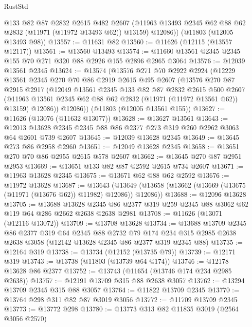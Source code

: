 \begin{lexlean}{RustStd}
\begin{coremodule}
        @133
        @82
        @87
        @2832
        @2615
        @482
        @2607
        (@11963 @13493 @2345 @62 @88 @62 @2832 (@11971 (@11972 @13493 @62)) @13159)
        @12086))
    (@11803 (@12005 @13493 @98))
@13557 := @11631 @82
@13560 := @11626 (@12115 (@13557 @12117))
@13561 := @13560 @13493
@13574 := @11660 @13561 @2345 @2345 @155 @70 @271 @320 @88 @2926 @155 @2896 @2965 @3064
@13576 := @12039 @13561 @2345
@13624 := @13574
    (@13576
      @271
      @70
      @2922
      @2924
      (@12229
        @13561
        @2345
        @270
        @70
        @86
        @2919
        @2615
        @495
        @2607
        (@13576
          @270
          @87
          @2915
          @2917
          (@12049
            @13561
            @2345
            @133
            @82
            @87
            @2832
            @2615
            @500
            @2607
            (@11963 @13561 @2345 @62 @88 @62 @2832 (@11971 (@11972 @13561 @62)) @13159)
            @12086))
        @12086))
    (@11803 (@12005 @13561 @155))
@13627 := @11626 (@13076 (@11632 @13077))
@13628 := @13627 @13561
@13643 := @12013 @13628 @2345 @2345 @88 @86 @2377 @273 @319 @260 @2962 @3063 @64 @2601 @739 @2607
@13645 := @12039 @13628 @2345
@13649 := @13645 @273 @86 @2958 @2960
@13651 := @12049 @13628 @2345
@13658 := @13651 @270 @70 @86 @2955 @2615 @578 @2607
@13662 := @13645 @270 @87 @2951 @2953
@13669 := @13651 @133 @82 @87 @2592 @2615 @734 @2607
@13671 := @11963 @13628 @2345
@13675 := @13671 @62 @88 @62 @2592
@13676 := @11972 @13628
@13687 := @13643
    (@13649 (@13658 (@13662 (@13669 (@13675 (@11971 (@13676 @62)) @11982) @12086)) @12086))
@13688 := @12096 @13628
@13705 := @13688
    @13628
    @2345
    @86
    @2377
    @319
    @259
    @2345
    @88
    @3062
    @62
    @119
    @64
    @286
    @2662
    @2638
    @2638
    @2981
@13708 := @11626 (@13071 (@12116 @13072))
@13709 := @13708 @13628
@13734 := @13688
    @13709
    @2345
    @86
    @2377
    @319
    @64
    @2345
    @88
    @2732
    @79
    @174
    @234
    @315
    @2985
    @2638
    @2638
    @3058
    (@12142 @13628 @2345 @86 @2377 @319 @2345 @88)
@13735 := @12164 @319
@13738 := @13734 (@12152 (@13735 @79))
@13739 := @12171 @319
@13743 := @13738 (@11803 (@13739 @64 @174))
@13746 := @12178 @13628 @86 @2377
@13752 := @13743 (@11654 (@13746 @174 @234 @2985 @2638))
@13757 := @12191 @13709 @315 @88 @2638 @3057
@13762 := @13294 @13709 @2345 @315 @88 @3057
@13764 := @11822 @13709 @2345
@13770 := @13764 @298 @311 @82 @87 @3019 @3056
@13772 := @11709 @13709 @2345
@13773 := @13772 @298
@13780 := @13773 @313 @82 @11835 @3019 (@2564 @3056 @2570)

\end{coremodule}
\end{lexlean}
